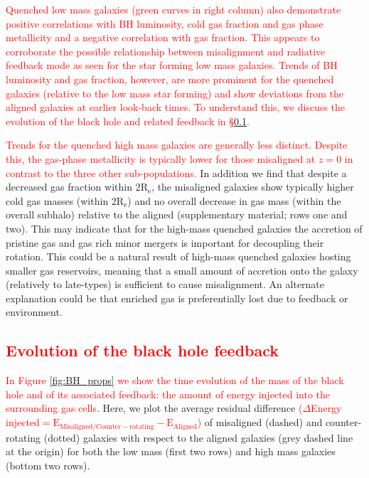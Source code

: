 \documentclass[fleqn,usenatbib]{mnras}
\newcommand{\red}[1]{{\textcolor{red}{#1}}}
\begin{document}
 \red{Quenched low mass galaxies (green curves in right column) also demonstrate positive correlations with BH luminosity, cold gas fraction and gas phase metallicity and a negative correlation with gas fraction. This appears to corroborate the possible relationship between misalignment and radiative feedback mode as seen for the star forming low mass galaxies. Trends of BH luminosity and gas fraction, however, are more prominent for the quenched galaxies (relative to the low mass star forming) and show deviations from the aligned galaxies at earlier look-back times. To understand this, we discuss the evolution of the black hole and related feedback in \S\ref{sec:evolution}.}
 
 \red{Trends for the quenched high mass galaxies are generally less distinct. Despite this, the gas-phase metallicity is typically lower for those misaligned at $z=0$ in contrast to the three other sub-populations.} In addition we find that despite a decreased gas fraction within 2$\mathrm{R_{e}}$, the misaligned galaxies show typically higher cold gas masses (within 2$\mathrm{R_{e}}$) and no overall decrease in gas mass (within the overall subhalo) relative to the aligned (supplementary material; rows one and two). This may indicate that for the high-mass quenched galaxies the accretion of pristine gas and gas rich minor mergers is important for decoupling their rotation. This could be a natural result of high-mass quenched galaxies hosting smaller gas reservoirs, meaning that a small amount of accretion onto the galaxy (relatively to late-types) is sufficient to cause misalignment. An alternate explanation could be that enriched gas is preferentially lost due to feedback or environment. %
 
 \subsection{\red{Evolution of the black hole feedback}} \label{sec:evolution}
 \red{In Figure \ref{fig:BH_props} we show the time evolution of the mass of the black hole and of its associated feedback: the amount of energy injected into the surrounding gas cells}. Here, we plot the average residual difference \red{($\Delta$Energy injected$\mathrm{ = E_{Misaligned/Counter-rotating} - E_{Aligned}}$)} of misaligned (dashed) and counter-rotating (dotted) galaxies with respect to the aligned galaxies (grey dashed line at the origin) for both the low mass (first two rows) and high mass galaxies (bottom two rows).
\end{document}
